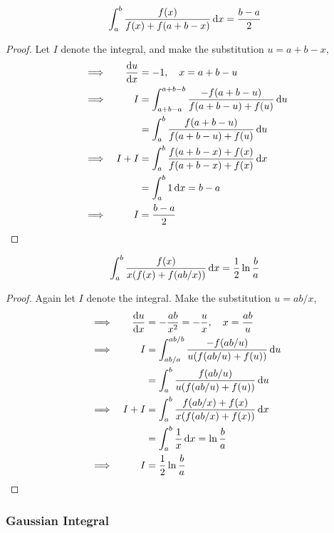 \begin{theorem}
\begin{equation*}
\integ[a]<b>{\frac{f(x)}{f(x) + f(a + b - x)}}{x} = \frac{b - a} 2
\end{equation*}
\end{theorem}
\begin{proof}
Let \(I\) denote the integral, and make the substitution \(u = a + b - x\),
\begin{alignat*}{2}
&\implies& \dv<u>{x} &= -1, \quad x = a + b - u \\
&\implies& I &= \integ[a + b - a]<a + b - b>{
                    \frac{-f(a + b - u)}{f(a + b - u) + f(u)}}{u} \\
&&  &= \integ[a]<b>{\frac{f(a + b - u)}{f(a + b - u) + f(u)}}{u} \\
&\implies& I + I &= \integ[a]<b>{
                    \frac{f(a + b - x) + f(x)}
                         {f(a + b - x) + f(x)}}{x} \\
&&  &= \integ[a]<b>{1}{x} = b - a \\
&\implies& I &= \frac{b - a} 2 \qedhere
\end{alignat*}
\end{proof}
\begin{theorem}
\begin{equation*}
\integ[a]<b>{\frac{f(x)}{x(f(x) + f(ab / x))}}{x} = \frac 12 \ln \frac ba
\end{equation*}
\end{theorem}
\begin{proof}
Again let \(I\) denote the integral. Make the substitution \(u = ab / x\),
\begin{alignat*}{2}
&\implies& \dv<u>{x} &= -\frac{ab}{x^2} = -\frac ux, \quad x = \frac{ab}u \\
&\implies& I &= \integ[ab/a]<ab/b>{\frac{-f(ab / u)}{u(f(ab / u) + f(u))}
}{u} \\
&& &= \integ[a]<b>{\frac{f(ab / u)}{u(f(ab / u) + f(u))}}{u} \\
&\implies& I + I &= \integ[a]<b>{\frac{f(ab / x) + f(x)}
                                  {x(f(ab / x) + f(x))}}{x} \\
&& &= \integ[a]<b>{\frac 1x}{x} = \ln \frac ba \\
&\implies& I &= \frac 12 \ln \frac ba \qedhere
\end{alignat*}
\end{proof}

\subsubsection{Gaussian Integral}


